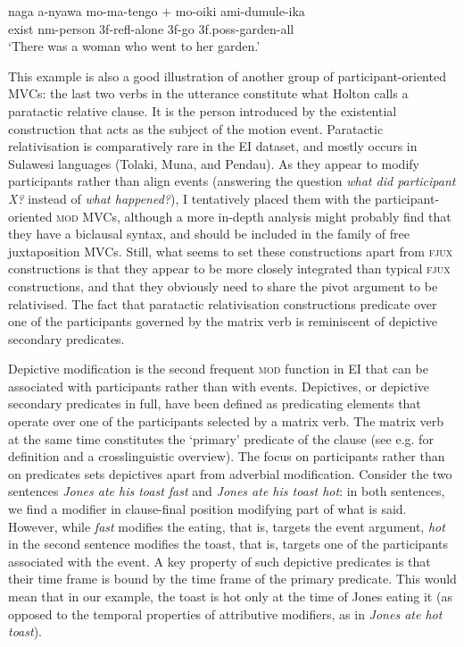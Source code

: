 \ea \label{Tobelo_29}
\gll naga a-nyawa mo-ma-tengo + mo-oiki ami-dumule-ika \\
exist \acs{nm}-person 3\acs{f}-\acs{refl}-alone 3\acs{f}-go 3\acs{f}.\acs{poss}-garden-\acs{all} \\
\glft `There was a woman who went to her garden.' \\ 
\z
\xe

This example is also a good illustration of another group of participant-oriented MVCs: the last two verbs in the utterance constitute what Holton calls a paratactic relative clause. It is the person introduced by the existential construction that acts as the subject of the motion event. Paratactic relativisation is comparatively rare in the EI dataset, and mostly occurs in Sulawesi languages (Tolaki, Muna, and Pendau). As they appear to modify participants rather than align events (answering the question \textit{what did participant X?} instead of \textit{what happened?}), I tentatively placed them with the participant-oriented \textsc{mod} MVCs, although a more in-depth analysis might probably find that they have a biclausal syntax, and should be included in the family of free juxtaposition MVCs. Still, what seems to set these constructions apart from \textsc{fjux} constructions is that they appear to be more closely integrated than typical \textsc{fjux} constructions, and that they obviously need to share the pivot argument to be relativised. The fact that paratactic relativisation constructions predicate over one of the participants governed by the matrix verb is reminiscent of depictive secondary predicates.

Depictive modification is the second frequent \textsc{mod} function in EI that can be associated with participants rather than with events. Depictives, or depictive secondary predicates in full, have been defined as predicating elements that operate over one of the participants selected by a matrix verb. The matrix verb at the same time constitutes the `primary' predicate of the clause (see e.g. \cite{schultze2004depictive} for definition and a crosslinguistic overview). The focus on participants rather than on predicates sets depictives apart from adverbial modification. Consider the two sentences \textit{Jones ate his toast fast} and \textit{Jones ate his toast hot}: in both sentences, we find a modifier in clause-final position modifying part of what is said. However, while \textit{fast} modifies the eating, that is, targets the event argument, \textit{hot} in the second sentence modifies the toast, that is, targets one of the participants associated with the event. A key property of such depictive predicates is that their time frame is bound by the time frame of the primary predicate. This would mean that in our example, the toast is hot only at the time of Jones eating it (as opposed to the temporal properties of attributive modifiers, as in \textit{Jones ate hot toast}).

